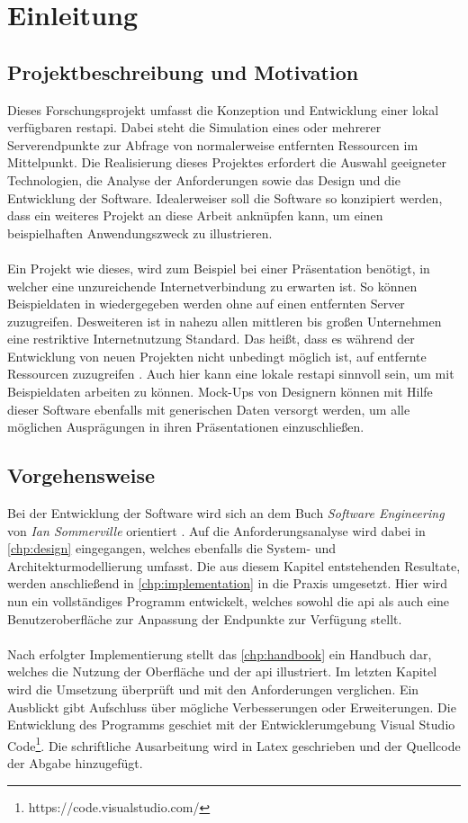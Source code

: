 \chapter{Einleitung} \label{chp:introduction}
\section{Projektbeschreibung und Motivation} \label{sec:purpose}
Dieses Forschungsprojekt umfasst die Konzeption und Entwicklung einer lokal verfügbaren \gls{restapi}. Dabei steht die Simulation eines oder mehrerer Serverendpunkte zur Abfrage von normalerweise entfernten Ressourcen im Mittelpunkt. Die Realisierung dieses Projektes erfordert die Auswahl geeigneter Technologien, die Analyse der Anforderungen sowie das Design und die Entwicklung der Software. Idealerweiser soll die Software so konzipiert werden, dass ein weiteres Projekt an diese Arbeit anknüpfen kann, um einen beispielhaften Anwendungszweck zu illustrieren.\\
\\ 
Ein Projekt wie dieses, wird zum Beispiel bei einer Präsentation benötigt, in welcher eine unzureichende Internetverbindung zu erwarten ist. So können Beispieldaten in wiedergegeben werden ohne auf einen entfernten Server zuzugreifen. 
Desweiteren ist in nahezu allen mittleren bis großen Unternehmen eine restriktive Internetnutzung Standard. Das heißt, dass es während der Entwicklung von neuen Projekten nicht unbedingt möglich ist, auf entfernte Ressourcen zuzugreifen \cite{Hunt.1998}. Auch hier kann eine lokale \gls{restapi} sinnvoll sein, um mit Beispieldaten arbeiten zu können. 
\newline
Mock-Ups von Designern können mit Hilfe dieser Software ebenfalls mit generischen Daten versorgt werden, um alle möglichen Ausprägungen in ihren Präsentationen 
einzuschließen.

\section{Vorgehensweise} \label{sec:approach}

Bei der Entwicklung der Software wird sich an dem Buch \textit{Software Engineering} von \textit{Ian Sommerville} orientiert \cite{Sommerville.2016}. Auf die Anforderungsanalyse wird dabei in \autoref{chp:design} eingegangen, welches ebenfalls die System- und Architekturmodellierung umfasst. Die aus diesem Kapitel entstehenden Resultate, werden anschließend in \autoref{chp:implementation} in die Praxis umgesetzt. Hier wird nun ein vollständiges Programm entwickelt, welches sowohl die \gls{api} als auch eine Benutzeroberfläche zur Anpassung der Endpunkte zur Verfügung stellt. \\ \\ Nach erfolgter Implementierung stellt das \autoref{chp:handbook} ein Handbuch dar, welches die Nutzung der Oberfläche und der \gls{api} illustriert. Im letzten Kapitel wird die Umsetzung überprüft und mit den Anforderungen verglichen. Ein Ausblickt gibt Aufschluss über mögliche Verbesserungen oder Erweiterungen. 
Die Entwicklung des Programms geschiet mit der Entwicklerumgebung Visual Studio Code\footnote{https://code.visualstudio.com/}. Die schriftliche Ausarbeitung wird in Latex geschrieben und der Quellcode der Abgabe hinzugefügt.